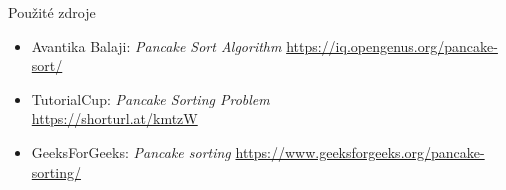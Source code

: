 \documentclass[10pt, hyperref={unicode}, compress]{beamer}
\begin{document}
    \begin{frame}{Použité zdroje}
        \begin{itemize}
            \item Avantika Balaji: \textit{Pancake Sort Algorithm} \url{https://iq.opengenus.org/pancake-sort/}
            \item TutorialCup: \textit{Pancake Sorting Problem} \\
                \url{https://shorturl.at/kmtzW}
            \item GeeksForGeeks: \textit{Pancake sorting} \url{https://www.geeksforgeeks.org/pancake-sorting/}
        \end{itemize}
    \end{frame}
\end{document}
